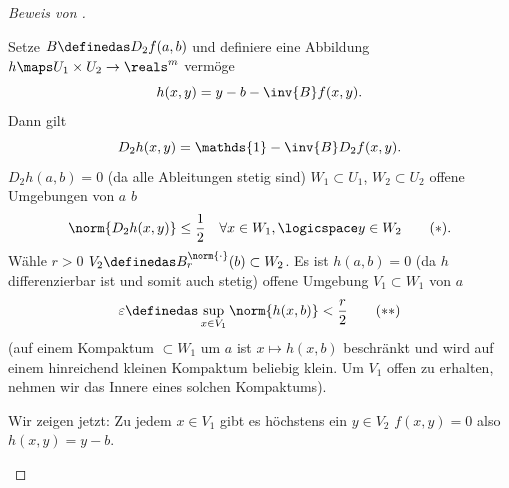 \begin{proof}[Beweis von ]
  \begin{proofenumerate}[label=\rechtsklammer{\arabic*}]
    Setze \( B\definedas D_2f(a,b)\) und definiere eine Abbildung \( h\maps U_1\times U_2\to \reals^m \) vermöge
    \begin{equation*}
      h(x,y)=y-b-\inv{B} f(x,y).
    \end{equation*}
    Dann gilt 
    \begin{equation*}
      D_2 h(x,y)=\mathds{1}-\inv{B} D_2 f(x,y).
    \end{equation*}
    \timplies \( D_2 h(a,b)=0 \) \timplies (da alle Ableitungen stetig sind) \texists \( W_1\subset U_1 \), \( W_2\subset U_2 \) offene Umgebungen von \( a \) \bzw \( b \) \sd
    \begin{equation*}
    \norm{D_2 h(x,y)}\leq \frac{1}{2}\quad \forall x\in W_1,\logicspace y\in W_2\tag{\(*\)}.\label{satz_von_der_impliziten_funktion:beweis:h:ableitungsnorm_bschraenkt}
    \end{equation*}
    Wähle \( r>0 \) \sd \( V_2\definedas B_r^{\norm{\cdot}}(b)\subset W_2 \). Es ist \( h(a,b)=0 \) \timplies (da \( h \) differenzierbar ist und somit auch stetig) \texists offene Umgebung \( V_1\subset W_1 \) von \( a \) \sd 
    \begin{equation*}
      \varepsilon\definedas \sup_{x\in V_1}\norm{h(x,b)}<\frac{r}{2} \tag{\( ** \)}\label{satz_von_der_impliziten_funktion:beweis:h:norm_bschraenkt}
    \end{equation*}
    (auf einem Kompaktum \( \subset W_1 \) um \( a \) ist \( x\mapsto h(x,b) \) beschränkt und wird auf einem hinreichend kleinen Kompaktum beliebig klein. Um \( V_1 \) offen zu erhalten, nehmen wir das Innere eines solchen Kompaktums).
    \item Wir zeigen jetzt: Zu jedem \( x\in V_1 \) gibt es höchstens ein \( y\in V_2 \) \sd \( f(x,y)=0 \) also \sd \( h(x,y)=y-b \).
    

\end{proofenumerate}
\end{proof}
